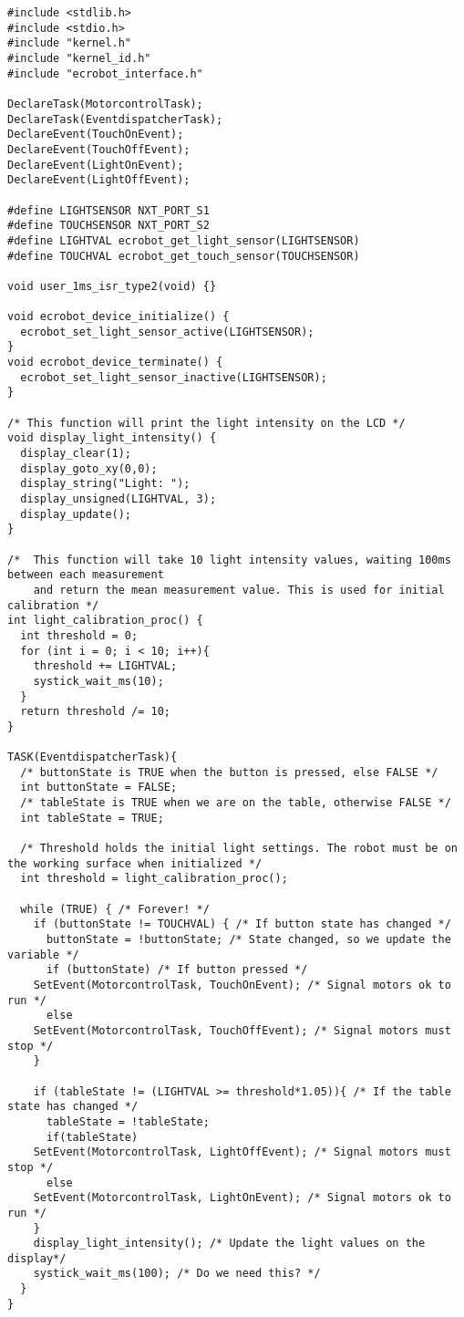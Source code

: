 \documentclass[a4paper,10pt]{report}
\begin{document}
\begin{lstlisting}[label=some-code,caption=part2.c,mathescape]
#include <stdlib.h>
#include <stdio.h>
#include "kernel.h"
#include "kernel_id.h"
#include "ecrobot_interface.h"

DeclareTask(MotorcontrolTask);
DeclareTask(EventdispatcherTask);
DeclareEvent(TouchOnEvent);
DeclareEvent(TouchOffEvent);
DeclareEvent(LightOnEvent);
DeclareEvent(LightOffEvent);

#define LIGHTSENSOR NXT_PORT_S1
#define TOUCHSENSOR NXT_PORT_S2
#define LIGHTVAL ecrobot_get_light_sensor(LIGHTSENSOR)
#define TOUCHVAL ecrobot_get_touch_sensor(TOUCHSENSOR)

void user_1ms_isr_type2(void) {}

void ecrobot_device_initialize() {
  ecrobot_set_light_sensor_active(LIGHTSENSOR);
}
void ecrobot_device_terminate() {
  ecrobot_set_light_sensor_inactive(LIGHTSENSOR);
}

/* This function will print the light intensity on the LCD */
void display_light_intensity() {
  display_clear(1);
  display_goto_xy(0,0);
  display_string("Light: ");
  display_unsigned(LIGHTVAL, 3);
  display_update();
}

/*  This function will take 10 light intensity values, waiting 100ms between each measurement
    and return the mean measurement value. This is used for initial calibration */
int light_calibration_proc() {
  int threshold = 0;
  for (int i = 0; i < 10; i++){
    threshold += LIGHTVAL;
    systick_wait_ms(10);
  }
  return threshold /= 10;
}

TASK(EventdispatcherTask){
  /* buttonState is TRUE when the button is pressed, else FALSE */ 
  int buttonState = FALSE;
  /* tableState is TRUE when we are on the table, otherwise FALSE */
  int tableState = TRUE;

  /* Threshold holds the initial light settings. The robot must be on the working surface when initialized */	
  int threshold = light_calibration_proc();
  
  while (TRUE) { /* Forever! */
    if (buttonState != TOUCHVAL) { /* If button state has changed */
      buttonState = !buttonState; /* State changed, so we update the variable */
      if (buttonState) /* If button pressed */
	SetEvent(MotorcontrolTask, TouchOnEvent); /* Signal motors ok to run */
      else
	SetEvent(MotorcontrolTask, TouchOffEvent); /* Signal motors must stop */
    }
    
    if (tableState != (LIGHTVAL >= threshold*1.05)){ /* If the table state has changed */
      tableState = !tableState;
      if(tableState)
	SetEvent(MotorcontrolTask, LightOffEvent); /* Signal motors must stop */
      else
	SetEvent(MotorcontrolTask, LightOnEvent); /* Signal motors ok to run */
    }
    display_light_intensity(); /* Update the light values on the display*/
    systick_wait_ms(100); /* Do we need this? */
  }
}


\end{lstlisting}
\end{document}
